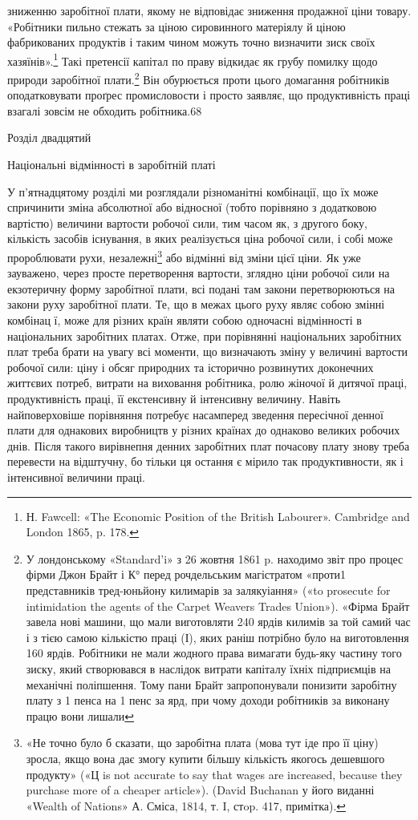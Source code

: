 зниженню заробітної плати, якому не відповідає зниження продажної
ціни товару. «Робітники пильно стежать за ціною сировинного
матеріялу й ціною фабрикованих продуктів і таким чином
можуть точно визначити зиск своїх хазяїнів».\footnote{
Н. Fawcell: «The Economic Position of the British Labourer».
Cambridge and London 1865, p. 178.
} Такі претенсії
капітал по праву відкидає як грубу помилку щодо природи
заробітної плати.\footnote{
У лондонському «Standard’i» з 26 жовтня 1861 p. находимо звіт
про процес фірми Джон Брайт і К° перед рочдельським магістратом
«проти1 представників тред-юньйону килимарів за залякуіання»
(«to prosecute for intimidation the agents of the Carpet Weavers Trades
Union»). «Фірма Брайт завела нові машини, що мали виготовляти 240 ярдів
килимів за той самий час і з тією самою кількістю праці (І), яких
раніш потрібно було на виготовлення 160 ярдів. Робітники не мали жодного
права вимагати будь-яку частину того зиску, який створювався в наслідок
витрати капіталу їхніх підприємців на механічні поліпшення. Тому
пани Брайт запропонували понизити заробітну плату з 1 пенса на
1 пенс за ярд, при чому доходи робітників за виконану працю вони лишали
} Він обурюється проти цього домагання робітників
оподатковувати проґрес промисловости і просто заявляє,
що продуктивність праці взагалі зовсім не обходить робітника.68

Розділ двадцятий

Національні відмінності в заробітній платі

У п’ятнадцятому розділі ми розглядали різноманітні комбінації,
що їх може спричинити зміна абсолютної або відносної
(тобто порівняно з додатковою вартістю) величини вартости робочої
сили, тим часом як, з другого боку, кількість засобів існування,
в яких реалізується ціна робочої сили, і собі може пророблювати
рухи, незалежні\footnote{
«Не точно було б сказати, що заробітна плата (мова тут іде про
її ціну) зросла, якщо вона дає змогу купити більшу кількість якогось
дешевшого продукту» («Ц is not accurate to say that wages are increased,
because they purchase more of a cheaper article»). (David Buchanan
у його виданні «Wealth of Nations» А. Сміса, 1814, т. I, стop. 417,
примітка).
} або відмінні від зміни цієї ціни. Як уже зауважено,
через просте перетворення вартости, зглядно ціни робочої
сили на екзотеричну форму заробітної плати, всі подані там
закони перетворюються на закони руху заробітної плати. Те,
що в межах цього руху являє собою змінні комбінац ї, може для
різних країн являти собою одночасні відмінності в національних
заробітних платах. Отже, при порівнянні національних заробітних
плат треба брати на увагу всі моменти, що визначають зміну
у величині вартости робочої сили: ціну і обсяг природних та
історично розвинутих доконечних життєвих потреб, витрати
на виховання робітника, ролю жіночої й дитячої праці, продуктивність
праці, її екстенсивну й інтенсивну величину. Навіть
найповерховіше порівняння потребує насамперед зведення пересічної
денної плати для однакових виробництв у різних країнах
до однаково великих робочих днів. Після такого вирівнепня денних
заробітних плат почасову плату знову треба перевести на
відштучну, бо тільки ця остання є мірило так продуктивности,
як і інтенсивної величини праці.

